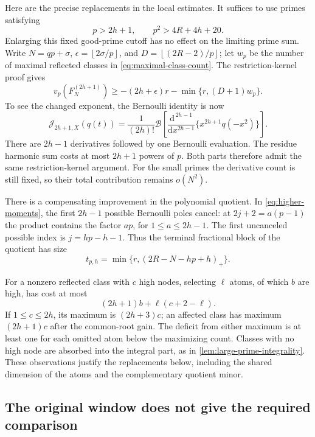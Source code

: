 \documentclass[11pt,letterpaper]{article}
\theoremstyle{definition}
\newcommand{\J}{\mathcal J}
\newcommand{\Bfun}{\mathcal B}
\newcommand{\pos}[1]{\left(#1\right)_{+}}
\newcommand{\floor}[1]{\left\lfloor #1\right\rfloor}
\begin{document}
Here are the precise replacements in the local estimates. It suffices
to use primes satisfying
\[
 p>2h+1,\qquad p^2>4R+4h+20.
\]
Enlarging this fixed good-prime cutoff has no effect on the limiting
prime sum. Write $N=qp+\sigma$, $\epsilon=\floor{2\sigma/p}$, and
$D=\floor{(2R-2)/p}$; let $w_p$ be the number of maximal reflected
classes in \eqref{eq:maximal-class-count}. The restriction-kernel proof
gives
\begin{equation}\label{eq:higher-rank-bound}
 v_p(F_N^{(2h+1)})\ge
 -(2h+\epsilon)r-\min\{r,(D+1)w_p\}.
\end{equation}
To see the changed exponent, the Bernoulli identity is now
\[
 \J_{2h+1,X}(q(t))=
 \frac1{(2h)!}\Bfun\!\left[
 \frac{\mathrm d^{\,2h-1}}{\mathrm d x^{2h-1}}
       \{x^{2h+1}q(-x^2)\}\right].
\]
There are $2h-1$ derivatives followed by one Bernoulli evaluation.
The residue harmonic sum costs at most $2h+1$ powers of $p$.
Both parts therefore admit the same restriction-kernel argument.
For the small primes the derivative count is still fixed, so their
total contribution remains $o(N^2)$.

There is a compensating improvement in the polynomial quotient.
In \eqref{eq:higher-moments}, the first $2h-1$ possible Bernoulli
poles cancel: at $2j+2=a(p-1)$ the product contains the factor $ap$,
for $1\le a\le2h-1$. The first uncanceled possible index is
$j=hp-h-1$. Thus the terminal fractional block of the quotient has size
\begin{equation}\label{eq:higher-terminal-block}
 t_{p,h}=\min\{r,\pos{2R-N-hp+h}\}.
\end{equation}

For a nonzero reflected class with $c$ high nodes, selecting $\ell$
atoms, of which $b$ are high, has cost at most
\[
 (2h+1)b+\ell(c+2-\ell).
\]
If $1\le c\le2h$, its maximum is $(2h+3)c$; an affected class has maximum
$(2h+1)c$ after the common-root gain. The deficit from either maximum
is at least one for each omitted atom below the maximizing count.
Classes with no high node are absorbed into the integral part, as in
\cref{lem:large-prime-integrality}.
These observations justify the replacements below, including the
shared dimension of the atoms and the complementary quotient minor.

\subsection{The original window does not give the required comparison}
\end{document}
